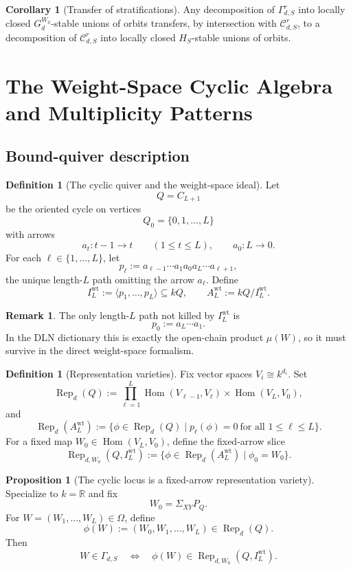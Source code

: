 \documentclass[11pt]{article}
\newcommand{\Hom}{\operatorname{Hom}}
\newcommand{\Rep}{\operatorname{Rep}}
\newcommand{\R}{\mathbb{R}}
\theoremstyle{definition}
\newtheorem{proposition}[theorem]{Proposition}
\newtheorem{corollary}[theorem]{Corollary}
\newtheorem{definition}[theorem]{Definition}
\newtheorem{remark}[theorem]{Remark}
\begin{document}
\begin{corollary}[Transfer of stratifications]
\label{cor:transfer-strata}
Any decomposition of \(\Gamma_{d,S}^r\) into locally closed
\(G_d^{W_0}\)-stable unions of orbits transfers, by intersection with
\(\mathcal C_{d,S}^r\), to a decomposition of \(\mathcal C_{d,S}^r\) into
locally closed \(H_S\)-stable unions of orbits.
\end{corollary}

\section{The Weight-Space Cyclic Algebra and Multiplicity Patterns}

\subsection{Bound-quiver description}

\begin{definition}[The cyclic quiver and the weight-space ideal]
Let
\[
Q=C_{L+1}
\]
be the oriented cycle on vertices
\[
Q_0=\{0,1,\dots,L\}
\]
with arrows
\[
a_t:t-1\to t
\qquad
(1\leq t\leq L),
\qquad
a_0:L\to 0.
\]
For each \(\ell\in \{1,\dots,L\}\), let
\[
p_\ell:=a_{\ell-1}\cdots a_1a_0a_L\cdots a_{\ell+1},
\]
the unique length-\(L\) path omitting the arrow \(a_\ell\). Define
\[
I_L^{\mathrm{wt}}:=\langle p_1,\dots,p_L\rangle\subseteq kQ,
\qquad
A_L^{\mathrm{wt}}:=kQ/I_L^{\mathrm{wt}}.
\]
\end{definition}

\begin{remark}
The only length-\(L\) path not killed by \(I_L^{\mathrm{wt}}\) is
\[
p_0:=a_L\cdots a_1.
\]
In the DLN dictionary this is exactly the open-chain product \(\mu(W)\), so it
must survive in the direct weight-space formalism.
\end{remark}

\begin{definition}[Representation varieties]
Fix vector spaces \(V_i\cong k^{d_i}\). Set
\[
\Rep_d(Q)
:=
\prod_{\ell=1}^L \Hom(V_{\ell-1},V_\ell)\times \Hom(V_L,V_0),
\]
and
\[
\Rep_d(A_L^{\mathrm{wt}})
:=
\{\phi\in \Rep_d(Q)\mid p_\ell(\phi)=0\ \text{for all }1\leq \ell\leq L\}.
\]
For a fixed map \(W_0\in \Hom(V_L,V_0)\), define the fixed-arrow slice
\[
\Rep_{d,W_0}(Q,I_L^{\mathrm{wt}})
:=
\{\phi\in \Rep_d(A_L^{\mathrm{wt}})\mid \phi_0=W_0\}.
\]
\end{definition}

\begin{proposition}[The cyclic locus is a fixed-arrow representation variety]
\label{prop:gamma-slice}
Specialize to \(k=\R\) and fix
\[
W_0=\Sigma_{XY}P_Q.
\]
For \(W=(W_1,\dots,W_L)\in \Omega\), define
\[
\phi(W):=(W_0,W_1,\dots,W_L)\in \Rep_d(Q).
\]
Then
\[
W\in \Gamma_{d,S}
\quad\Longleftrightarrow\quad
\phi(W)\in \Rep_{d,W_0}(Q,I_L^{\mathrm{wt}}).
\]
\end{proposition}
\end{document}
